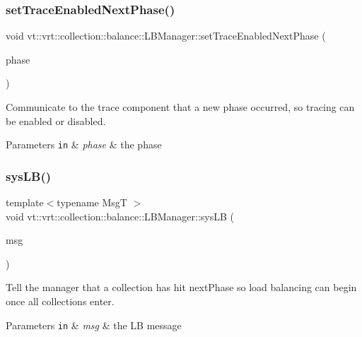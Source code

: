\subsubsection{\texorpdfstring{set\+Trace\+Enabled\+Next\+Phase()}{setTraceEnabledNextPhase()}}
{\footnotesize\ttfamily void vt\+::vrt\+::collection\+::balance\+::\+L\+B\+Manager\+::set\+Trace\+Enabled\+Next\+Phase (\begin{DoxyParamCaption}\item[{\hyperlink{namespacevt_a46ce6733d5cdbd735d561b7b4029f6d7}{Phase\+Type}}]{phase }\end{DoxyParamCaption})}



Communicate to the trace component that a new phase occurred, so tracing can be enabled or disabled. 


\begin{DoxyParams}[1]{Parameters}
\mbox{\tt in}  & {\em phase} & the phase \\
\hline
\end{DoxyParams}
\mbox{\label{structvt_1_1vrt_1_1collection_1_1balance_1_1_l_b_manager_a5a3a3a1c74201981c2d62b85c2e84006}} 
\subsubsection{\texorpdfstring{sys\+L\+B()}{sysLB()}}
{\footnotesize\ttfamily template$<$typename MsgT $>$ \\
void vt\+::vrt\+::collection\+::balance\+::\+L\+B\+Manager\+::sys\+LB (\begin{DoxyParamCaption}\item[{MsgT $\ast$}]{msg }\end{DoxyParamCaption})\hspace{0.3cm}{\ttfamily [inline]}}



Tell the manager that a collection has hit {\ttfamily next\+Phase} so load balancing can begin once all collections enter. 


\begin{DoxyParams}[1]{Parameters}
\mbox{\tt in}  & {\em msg} & the LB message \\
\hline
\end{DoxyParams}
\mbox{\label{structvt_1_1vrt_1_1collection_1_1balance_1_1_l_b_manager_a50a782417c408ce3c33e7d70ebcd5d2e}} 
